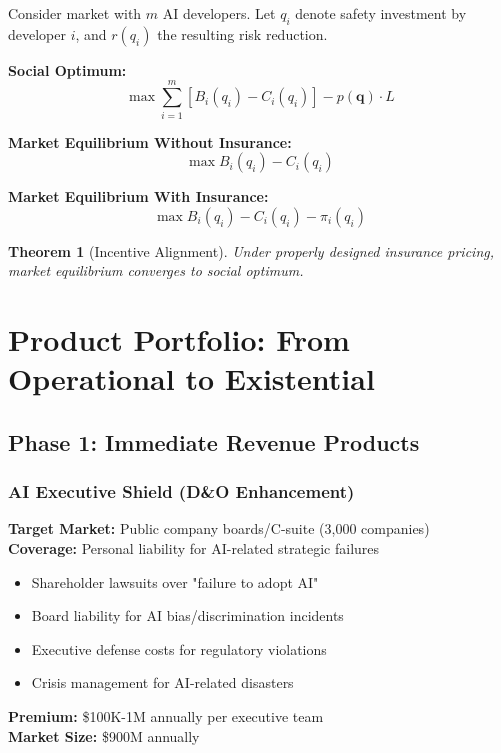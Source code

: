 \documentclass[11pt]{article}
\newtheorem{theorem}{Theorem}
\begin{document}
Consider market with $m$ AI developers. Let $q_i$ denote safety investment by developer $i$, and $r(q_i)$ the resulting risk reduction.

\textbf{Social Optimum:}
$$\max \sum_{i=1}^m [B_i(q_i) - C_i(q_i)] - p(\mathbf{q}) \cdot L$$

\textbf{Market Equilibrium Without Insurance:}
$$\max B_i(q_i) - C_i(q_i)$$

\textbf{Market Equilibrium With Insurance:}
$$\max B_i(q_i) - C_i(q_i) - \pi_i(q_i)$$

\begin{theorem}[Incentive Alignment]
Under properly designed insurance pricing, market equilibrium converges to social optimum.
\end{theorem}

\section{Product Portfolio: From Operational to Existential}

\subsection{Phase 1: Immediate Revenue Products}

\subsubsection{AI Executive Shield (D\&O Enhancement)}
\textbf{Target Market:} Public company boards/C-suite (3,000 companies)\\
\textbf{Coverage:} Personal liability for AI-related strategic failures
\begin{itemize}
   \item Shareholder lawsuits over "failure to adopt AI"
   \item Board liability for AI bias/discrimination incidents  
   \item Executive defense costs for regulatory violations
   \item Crisis management for AI-related disasters
\end{itemize}
\textbf{Premium:} \$100K-1M annually per executive team\\
\textbf{Market Size:} \$900M annually
\end{document}
